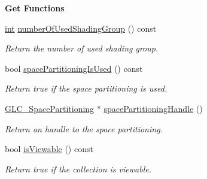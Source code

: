 \begin{Indent}{\bf Get Functions}
\begin{DoxyCompactItemize}
\hyperlink{ioapi_8h_a787fa3cf048117ba7123753c1e74fcd6}{int} \hyperlink{class_g_l_c__3_d_view_collection_a30399b53ac353698d8e6a7055cc5ef28}{number\-Of\-Used\-Shading\-Group} () const 
\begin{DoxyCompactList}\small\item\em Return the number of used shading group. \end{DoxyCompactList}\item 
bool \hyperlink{class_g_l_c__3_d_view_collection_adc51ca601e8d53ba1575a8e367266aed}{space\-Partitioning\-Is\-Used} () const 
\begin{DoxyCompactList}\small\item\em Return true if the space partitioning is used. \end{DoxyCompactList}\item 
\hyperlink{class_g_l_c___space_partitioning}{G\-L\-C\-\_\-\-Space\-Partitioning} $\ast$ \hyperlink{class_g_l_c__3_d_view_collection_a27f3c8f7ccd479101bf0139f706e9200}{space\-Partitioning\-Handle} ()
\begin{DoxyCompactList}\small\item\em Return an handle to the space partitioning. \end{DoxyCompactList}\item 
bool \hyperlink{class_g_l_c__3_d_view_collection_af6f519eada07aa90caf0f3835ba69e1b}{is\-Viewable} () const 
\begin{DoxyCompactList}\small\item\em Return true if the collection is viewable. \end{DoxyCompactList}\end{DoxyCompactItemize}
\end{Indent}
